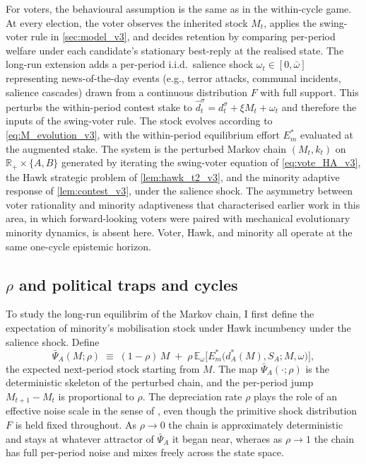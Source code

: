 \documentclass[11pt,twoside]{extarticle}
\begin{document}
For voters, the behavioural assumption is the same as in the within-cycle game. At every election, the voter observes the inherited stock $M_t$, applies the swing-voter rule in \autoref{sec:model_v3}, and decides retention by comparing per-period welfare under each candidate's stationary best-reply at the realised state. 
The long-run extension adds a per-period i.i.d.\ salience shock $\omega_t\in[0,\bar\omega]$ representing news-of-the-day events (e.g., terror attacks, communal incidents, salience cascades) drawn from a continuous distribution $F$ with full support.
This perturbs the within-period contest stake to $\hat d_t^\sigma=d_t^\sigma+\xi M_t+\omega_t$ and therefore the inputs of the swing-voter rule. 
The stock evolves according to \eqref{eq:M_evolution_v3}, with the within-period equilibrium effort $E_m^*$ evaluated at the augmented stake.
The system is the perturbed Markov chain $(M_t,k_t)$ on $\mathbb R_+\times\{A,B\}$ generated by iterating the swing-voter equation of \eqref{eq:vote_HA_v3}, the Hawk strategic problem of \autoref{lem:hawk_t2_v3}, and the minority adaptive response of \autoref{lem:contest_v3}, under the salience shock. 
The asymmetry between voter rationality and minority adaptiveness that characterised earlier work in this area, in which forward-looking voters were paired with mechanical evolutionary minority dynamics, is absent here. Voter, Hawk, and minority all operate at the same one-cycle epistemic horizon.

\subsection{$\rho$ and political traps and cycles}\label{subsec:bifurcation_v3}

To study the long-run equilibrim of the Markov chain, I first define the expectation of minority's mobilisation stock under Hawk incumbency under the salience shock. Define
\begin{equation}\label{eq:drift_v3}
    \bar\Psi_A(M;\rho)\;\equiv\;(1-\rho)\,M\;+\;\rho\,\mathbb{E}_\omega\big[E_m^*\big(d_A^*(M),S_A;M,\omega\big)\big],
\end{equation}
the expected next-period stock starting from $M$. The map $\bar\Psi_A(\cdot;\rho)$ is the deterministic skeleton of the perturbed chain, and the per-period jump $M_{t+1}-M_t$ is proportional to $\rho$. 
The depreciation rate $\rho$ plays the role of an effective noise scale in the sense of \citet{youngEvolutionConventions1993}, even though the primitive shock distribution $F$ is held fixed throughout. 
As $\rho\to 0$ the chain is approximately deterministic and stays at whatever attractor of $\bar\Psi_A$ it began near, wheraes as $\rho\to 1$ the chain has full per-period noise and mixes freely across the state space.
\end{document}

